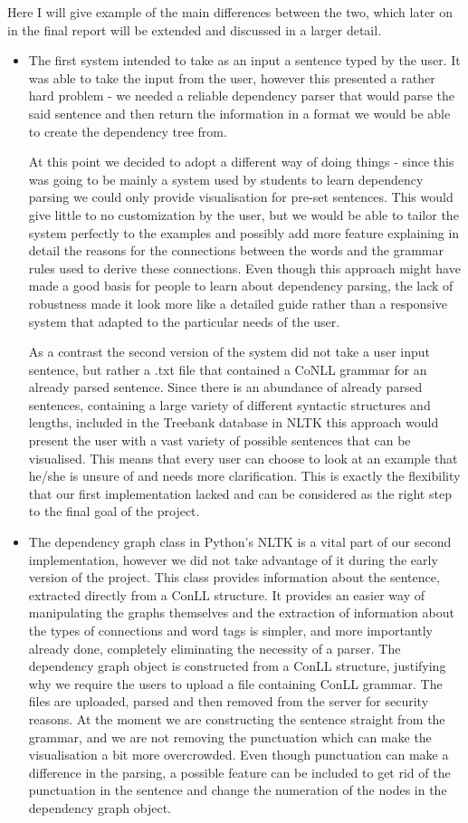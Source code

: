 \documentclass[bsc,frontabs,twoside,singlespacing,parskip,deptrepor]{infthesis}
\begin{document}
Here I will give example of the main differences between the two, which later on in the final report will be extended and discussed in a larger detail.
\begin{itemize}
\item The first system intended to take as an input a sentence typed by the user. It was able to take the input from the user, however this presented a rather hard problem - we needed a reliable dependency parser that would parse the said sentence and then return the information in a format we would be able to create the dependency tree from. 


At this point we decided to adopt a different way of doing things - since this was going to be mainly a system used by students to learn dependency parsing we could only provide visualisation for pre-set sentences. This would give little to no customization by the user, but we would be able to tailor the system perfectly to the examples and possibly add more feature explaining in detail the reasons for the connections between the words and the grammar rules used to derive these connections. Even though this approach might have made a good basis for people to learn about dependency parsing, the lack of robustness made it look more like a detailed guide rather than a responsive system that adapted to the particular needs of the user. 

As a contrast the second version of the system did not take a user input sentence, but rather a .txt file that contained a CoNLL grammar for an already parsed sentence. Since there is an abundance of already parsed sentences, containing a large variety of different syntactic structures and lengths, included in the Treebank database in NLTK this approach would present the user with a vast variety of possible sentences that can be visualised. This means that every user can choose to look at an example that he/she is unsure of and needs more clarification. This is exactly the flexibility that our first implementation lacked and can be considered as the right step to the final goal of the project.

\item The dependency graph class in Python's NLTK is a vital part of our second implementation, however we did not take advantage of it during the early version of the project. This class provides information about the sentence, extracted directly from a ConLL structure. It provides an easier way of manipulating the graphs themselves and the extraction of information about the types of connections and word tags is simpler, and more importantly already done, completely eliminating the necessity of a parser. The dependency graph object is constructed from a ConLL structure, justifying why we require the users to upload a file containing ConLL grammar. The files are uploaded, parsed and then removed from the server for security reasons. At the moment we are constructing the sentence straight from the grammar, and we are not removing the punctuation which can make the visualisation a bit more overcrowded. Even though punctuation can make a difference in the parsing, a possible feature can be included to get rid of the punctuation in the sentence and change the numeration of the nodes in the dependency graph object.


\end{itemize}
\end{document}
